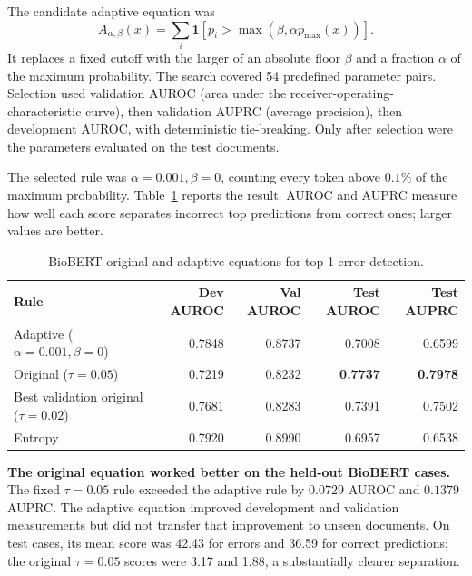 \documentclass[11pt,a4paper]{article}
\begin{document}
The candidate adaptive equation was
\begin{equation}
A_{\alpha,\beta}(x)=\sum_i\mathbf{1}\!\left[p_i>\max\!\left(\beta,\alpha p_{\max}(x)\right)\right].
\label{eq:adaptive-volume}
\end{equation}
It replaces a fixed cutoff with the larger of an absolute floor $\beta$ and a fraction $\alpha$ of the maximum probability. The search covered 54 predefined parameter pairs. Selection used validation AUROC (area under the receiver-operating-characteristic curve), then validation AUPRC (average precision), then development AUROC, with deterministic tie-breaking. Only after selection were the parameters evaluated on the test documents.

The selected rule was $\alpha=0.001,\beta=0$, counting every token above $0.1\%$ of the maximum probability. Table~\ref{tab:biobert-optimization} reports the result. AUROC and AUPRC measure how well each score separates incorrect top predictions from correct ones; larger values are better.

\begin{table}[h]
\centering
\caption{BioBERT original and adaptive equations for top-1 error detection.}
\label{tab:biobert-optimization}
{\scriptsize
\setlength{\tabcolsep}{4pt}
\begin{tabular}{p{5.2cm}rrrr}
\toprule
Rule & Dev AUROC & Val AUROC & Test AUROC & Test AUPRC \\
\midrule
Adaptive ($\alpha=0.001,\beta=0$) & 0.7848 & 0.8737 & 0.7008 & 0.6599 \\
Original ($\tau=0.05$) & 0.7219 & 0.8232 & \textbf{0.7737} & \textbf{0.7978} \\
Best validation original ($\tau=0.02$) & 0.7681 & 0.8283 & 0.7391 & 0.7502 \\
Entropy & 0.7920 & 0.8990 & 0.6957 & 0.6538 \\
\bottomrule
\end{tabular}
}
\end{table}

\textbf{The original equation worked better on the held-out BioBERT cases.} The fixed $\tau=0.05$ rule exceeded the adaptive rule by $0.0729$ AUROC and $0.1379$ AUPRC. The adaptive equation improved development and validation measurements but did not transfer that improvement to unseen documents. On test cases, its mean score was 42.43 for errors and 36.59 for correct predictions; the original $\tau=0.05$ scores were 3.17 and 1.88, a substantially clearer separation.
\end{document}
